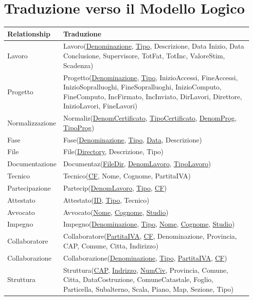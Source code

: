 \documentclass{elegantbook}
\begin{document}
	\section{Traduzione verso il Modello Logico}
	\begin{longtable}{|p{3cm}|p{12cm}|}
		\hline
		\textbf{Relationship} & \textbf{Traduzione} \\
		\hline
		Lavoro & Lavoro(\underline{Denominazione}, \underline{Tipo}, Descrizione, Data Inizio, Data Conclusione, Supervisore,  TotFat, TotInc, ValoreStim, Scadenza) \\
		\hline
		Progetto & Progetto(\underline{Denominazione}, \underline{Tipo}, InizioAccessi, FineAccessi, InizioSopralluoghi, FineSopralluoghi, InizioComputo, FineComputo, IncFirmato, IncInviato, DirLavori, Direttore, InizioLavori, FineLavori)\\
		\hline
		Normalizzazione & Normaliz(\underline{DenomCertificato}, \underline{TipoCertificato}, \underline{DenomProg}, \underline{TipoProg}) \\
		\hline
		Fase & Fase(\underline{Denominazione}, \underline{Tipo}, \underline{Data}, Descrizione)\\
		\hline
		File & File(\underline{Directory}, Descrizione, Tipo) \\
		\hline
		Documentazione & Documentaz(\underline{FileDir}, \underline{DenomLavoro}, \underline{TipoLavoro})\\
		\hline
		Tecnico & Tecnico(\underline{CF}, Nome, Cognome, PartitaIVA)\\
		\hline 
		Partecipazione & Partecip(\underline{DenomLavoro}, \underline{Tipo}, \underline{CF}) \\
		\hline
		Attestato & Attestato(\underline{ID}, \underline{Tipo}, Tecnico) \\
		\hline
		Avvocato & Avvocato(\underline{Nome}, \underline{Cognome}, \underline{Studio})\\
		\hline
		Impegno & Impegno(\underline{Denominazione}, \underline{Tipo}, \underline{Nome}, \underline{Cognome}, \underline{Studio})\\
		\hline
		Collaboratore & Collaboratore(\underline{PartitaIVA}, \underline{CF}, Denominazione, Provincia, CAP, Comune, Citta, Indirizzo)\\
		\hline
		Collaborazione & Collaborazione(\underline{Denominazione}, \underline{Tipo}, \underline{PartitaIVA}, \underline{CF})\\
		\hline
		Struttura & Struttura(\underline{CAP}, \underline{Indrizzo}, \underline{NumCiv}, Provincia, Comune, Citta, DataCostruzione, ComuneCatastale, Foglio, Particella, Subalterno, Scala, Piano, Map, Sezione, Tipo)\\

\end{longtable}
\end{document}
